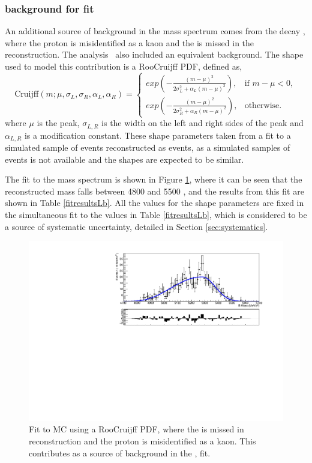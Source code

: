\subsubsection{\boldmath \decay{\Lb}{\Lc\Kstar} background for \decay{\D}{\Kp\Km} fit}
\label{sec:backgrounds:Lb2LcKst}

An additional source of background in the \kk \Bm mass spectrum comes from the decay , where the proton is misidentified as a kaon and the \pion is missed in the reconstruction. The \decay{\Bm}{\D\Km} analysis~\cite{LHCb-PAPER-2016-003} also included an equivalent  background. The shape used to model this contribution is a RooCruijff PDF, defined as,
\begin{equation}
  \mathrm{Cruijff}(m; \mu,\sigma_L,\sigma_R,\alpha_L,\alpha_R)=
\begin{cases}
    exp \left( -\frac{(m-\mu)^2}{2\sigma_L^2 + \alpha_L(m-\mu)^2} \right) ,     & \text{if } m-\mu < 0, \\
    exp \left( -\frac{(m-\mu)^2}{2\sigma_R^2 + \alpha_R(m-\mu)^2} \right) ,     & \text{otherwise.}
\end{cases}
\label{Cruijff}
\end{equation}%
where $\mu$ is the peak, $\sigma_{L,R}$ is the width on the left and right sides of the peak and $\alpha_{L,R}$ is a modification constant. These shape parameters taken from a fit to a simulated sample of \decay{\Lb}{\Lc\Km} events reconstructed as \decay{\Bm}{\D\Km} events, as a simulated samples of \decay{\Lb}{\Lc\Kstarm} events is not available and the shapes are expected to be similar.

The fit to the \Bm mass spectrum is shown in Figure \ref{Lbfit}, where it can be seen that the reconstructed \Bm mass falls between 4800 and 5500 \mevcc, and the results from this fit are shown in Table \ref{fitresultsLb}. All the values for the shape parameters are fixed in the simultaneous fit to the values in Table \ref{fitresultsLb}, which is considered to be a source of systematic uncertainty, detailed in Section \ref{sec:systematics}. 

\begin{figure}[h]
\centering
\includegraphics[width=0.7\linewidth]{figures/backgrounds/Lb2LcKst.pdf}
\caption{Fit to  MC using a RooCruijff PDF, where the \pion is missed in reconstruction and the proton is misidentified as a kaon. This contributes as a source of background in the \decay{\Bm}{\D\Kstarm}, \decay{\D}{\Kp\Km} fit.}
\label{Lbfit}
\end{figure}

